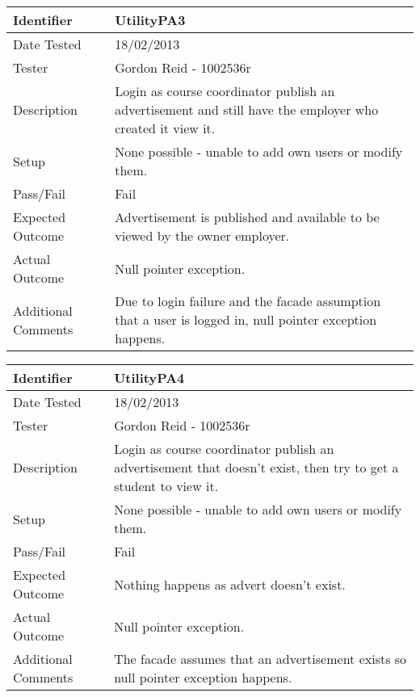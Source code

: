 \begin{tabularx}{\textwidth}{|T|L|}
\hline
Identifier & UtilityPA3\\
\hline
Date Tested & 18/02/2013\\
\hline
Tester & Gordon Reid - 1002536r\\
\hline
Description & Login as course coordinator publish an advertisement and still
have the employer who created it view it.\\
\hline
Setup & None possible - unable to add own users or modify them.\\
\hline
Pass/Fail & Fail\\
\hline
Expected Outcome & Advertisement is published and available to be viewed by the
owner employer.\\
\hline
Actual Outcome & Null pointer exception.\\
\hline
Additional Comments & Due to login failure and the facade assumption that a user 
is logged in, null pointer exception happens.\\
\hline
\end{tabularx}

\vspace{2em}

\begin{tabularx}{\textwidth}{|T|L|}
\hline
Identifier & UtilityPA4\\
\hline
Date Tested & 18/02/2013\\
\hline
Tester & Gordon Reid - 1002536r\\
\hline
Description & Login as course coordinator publish an advertisement that
doesn't exist, then try to get a student to view it.\\
\hline
Setup & None possible - unable to add own users or modify them.\\
\hline
Pass/Fail & Fail\\
\hline
Expected Outcome & Nothing happens as advert doesn't exist.\\
\hline
Actual Outcome & Null pointer exception.\\
\hline
Additional Comments & The facade assumes that an advertisement exists so
null pointer exception happens.\\
\hline
\end{tabularx}

\vspace{2em}


